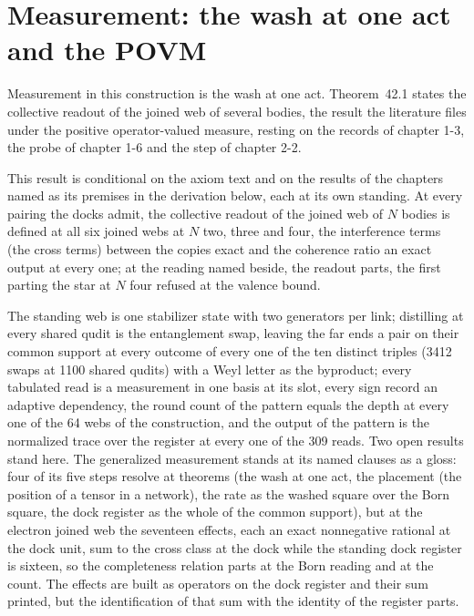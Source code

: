 \section{Measurement: the wash at one act and the POVM}\label{mod:II-4-measurement-the-wash-at-one-act-and-the-povm}
\label{narr:open:2-4}Measurement in this construction is the wash at one act. Theorem~42.1 states the collective readout of the joined web of several bodies, the result the literature files under the positive operator-valued measure, resting on the records of chapter 1-3, the probe of chapter 1-6 and the step of chapter 2-2.
\begin{chconditional}\label{box:II-4-measurement-the-wash-at-one-act-and-the-povm:1}
This result is conditional on the axiom text and on the results of the chapters named as its premises in the derivation below, each at its own standing.
At every pairing the docks admit, the collective readout of the joined web of $N$ bodies is defined at all six joined webs at $N$ two, three and four, the interference terms (the cross terms) between the copies exact and the coherence ratio an exact output at every one; at the reading named beside, the readout parts, the first parting the star at $N$ four refused at the valence bound.
\end{chconditional}
The standing web is one stabilizer state with two generators per link; distilling at every shared qudit is the entanglement swap, leaving the far ends a pair on their common support at every outcome of every one of the ten distinct triples (3412 swaps at 1100 shared qudits) with a Weyl letter as the byproduct; every tabulated read is a measurement in one basis at its slot, every sign record an adaptive dependency, the round count of the pattern equals the depth at every one of the 64 webs of the construction, and the output of the pattern is the normalized trace over the register at every one of the 309 reads.
Two open results stand here. The generalized measurement stands at its named clauses as a gloss: four of its five steps resolve at theorems (the wash at one act, the placement (the position of a tensor in a network), the rate as the washed square over the Born square, the dock register as the whole of the common support), but at the electron joined web the seventeen effects, each an exact nonnegative rational at the dock unit, sum to the cross class at the dock while the standing dock register is sixteen, so the completeness relation parts at the Born reading and at the count. The effects are built as operators on the dock register and their sum printed, but the identification of that sum with the identity of the register parts.
